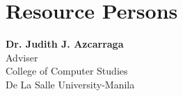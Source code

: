 %
%
%                 

\chapter{Resource Persons}
\label{sec:appendixc}

%
%
%
%

%
%
\newcommand{\resperson}[4]{\textbf{#1} \\ #2 \\ #3 \\ \url{#4}\vspace{0.5em}\\}

\textbf{Dr. Judith J. Azcarraga} \\ Adviser \\ College of Computer Studies\\De La Salle University-Manila \\ \vspace{0.5em}\\

